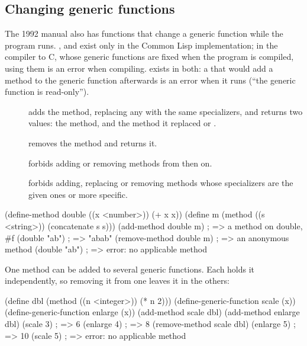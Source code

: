 \subsection{Changing generic functions}\label{sec:functions-changing}

The 1992 manual also has functions that change a generic function while the
program runs. ,  and
 exist only in the Common Lisp implementation; in the
compiler to C, whose generic functions are fixed when the program is
compiled, using them is an error when compiling. 
exists in both: a  that would add a method to the
generic function afterwards is an error when it runs (``the generic
function is read-only'').

\begin{description}
\item[] adds the
  method, replacing any with the same specializers, and returns two values:
  the method, and the method it replaced or .
\item[] removes
  the method and returns it.
\item[] forbids adding or
  removing methods from then on.
\item[]
  forbids adding, replacing or removing methods whose specializers are the
  given ones or more specific.
\end{description}

\begin{dylan}
(define-method double ((x <number>)) (+ x x))
(define m (method ((s <string>)) (concatenate s s)))
(add-method double m)          ; => {a method on double}, #f
(double "ab")                  ; => "abab"
(remove-method double m)       ; => {an anonymous method}
(double "ab")                  ; => error: no applicable method
\end{dylan}

\noindent One method can be added to several generic functions. Each holds
it independently, so removing it from one leaves it in the others:

\begin{dylan}
(define dbl (method ((n <integer>)) (* n 2)))
(define-generic-function scale (x))
(define-generic-function enlarge (x))
(add-method scale dbl)
(add-method enlarge dbl)
(scale 3)                      ; => 6
(enlarge 4)                    ; => 8
(remove-method scale dbl)
(enlarge 5)                    ; => 10
(scale 5)                      ; => error: no applicable method
\end{dylan}

